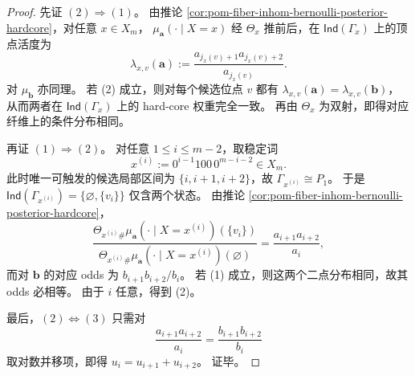 \begin{proof}
先证 \((2)\Rightarrow(1)\)。
由推论 \ref{cor:pom-fiber-inhom-bernoulli-posterior-hardcore}，对任意 \(x\in X_m\)，
\(
\mu_{\boldsymbol a}(\cdot\mid X=x)
\)
经 \(\Theta_x\) 推前后，在 \(\mathsf{Ind}(\Gamma_x)\) 上的顶点活度为
\[
\lambda_{x,v}(\boldsymbol a)
:=\frac{a_{j_x(v)+1}a_{j_x(v)+2}}{a_{j_x(v)}}.
\]
对 \(\mu_{\boldsymbol b}\) 亦同理。
若 (2) 成立，则对每个候选位点 \(v\) 都有
\(
\lambda_{x,v}(\boldsymbol a)=\lambda_{x,v}(\boldsymbol b)
\)，
从而两者在 \(\mathsf{Ind}(\Gamma_x)\) 上的 hard-core 权重完全一致。
再由 \(\Theta_x\) 为双射，即得对应纤维上的条件分布相同。

再证 \((1)\Rightarrow(2)\)。
对任意 \(1\le i\le m-2\)，取稳定词
\[
x^{(i)}:=0^{i-1}100\,0^{m-i-2}\in X_m.
\]
此时唯一可触发的候选局部区间为 \(\{i,i+1,i+2\}\)，故
\(
\Gamma_{x^{(i)}}\cong P_1
\)。
于是
\(
\mathsf{Ind}(\Gamma_{x^{(i)}})=\{\varnothing,\{v_i\}\}
\)
仅含两个状态。
由推论 \ref{cor:pom-fiber-inhom-bernoulli-posterior-hardcore}，
\[
\frac{
\Theta_{x^{(i)}\#}\mu_{\boldsymbol a}(\cdot\mid X=x^{(i)})(\{v_i\})
}{
\Theta_{x^{(i)}\#}\mu_{\boldsymbol a}(\cdot\mid X=x^{(i)})(\varnothing)
}
=
\frac{a_{i+1}a_{i+2}}{a_i},
\]
而对 \(\boldsymbol b\) 的对应 odds 为
\(
b_{i+1}b_{i+2}/b_i
\)。
若 (1) 成立，则这两个二点分布相同，故其 odds 必相等。
由于 \(i\) 任意，得到 (2)。

最后，\((2)\Leftrightarrow(3)\) 只需对
\[
\frac{a_{i+1}a_{i+2}}{a_i}=\frac{b_{i+1}b_{i+2}}{b_i}
\]
取对数并移项，即得
\(
u_i=u_{i+1}+u_{i+2}
\)。
证毕。
\end{proof}

